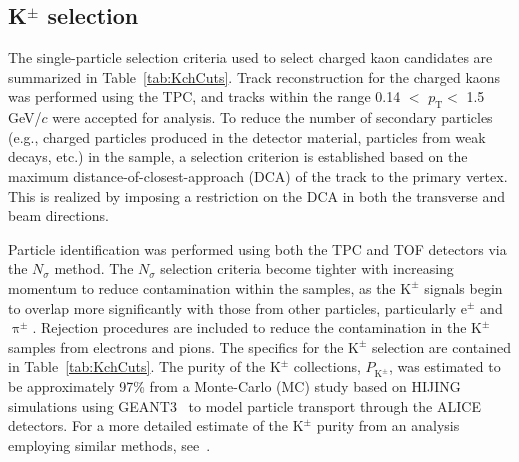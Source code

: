 \documentclass[ALICE,manyauthors]{cernphprep}
\newcommand{\pt}{$p_{\mathrm{T}}$\xspace}
\newcommand{\Kpm}{$\mathrm{K^{\pm}}$\xspace}
\begin{document}
\subsection{K$^{\pm}$ selection}
\label{sec:KchSelection}
The single-particle selection criteria used to select charged kaon candidates are summarized in Table~\ref{tab:KchCuts}.
Track reconstruction for the charged kaons was performed using the TPC, and tracks within the range 0.14 $<$ \pt $<$ 1.5 GeV/$c$ were accepted for analysis.
To reduce the number of secondary particles (e.g., charged particles produced in the detector material, particles from weak decays, etc.) in the sample, a selection criterion is established based on the maximum distance-of-closest-approach (DCA) of the track to the primary vertex.
This is realized by imposing a restriction on the DCA in both the transverse and beam directions.

Particle identification was performed using both the TPC and TOF detectors via the $N_{\sigma}$ method. 
The $N_{\sigma}$ selection criteria become tighter with increasing momentum to reduce contamination within the samples, as the \Kpm signals begin to overlap more significantly with those from other particles, particularly e$^{\pm}$ and $\uppi^{\pm}$.
Rejection procedures are included to reduce the contamination in the \Kpm samples from electrons and pions.  
The specifics for the \Kpm selection are contained in Table~\ref{tab:KchCuts}.
The purity of the \Kpm collections, $P_{\mathrm{K}^{\pm}}$, was estimated to be approximately 97\% from a Monte-Carlo (MC) study based on HIJING~\cite{PhysRevD.44.3501} simulations using GEANT3~\cite{Brun:1082634} to model particle transport through the ALICE detectors. 
For a more detailed estimate of the \Kpm purity from an analysis employing similar methods, see~\cite{Acharya:2017qtq}.
\end{document}
